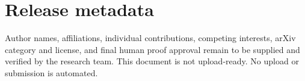 \documentclass[a4paper,twocolumn,11pt,unpublished]{quantumarticle}
\begin{document}
\section*{Release metadata}

Author names, affiliations, individual contributions, competing interests,
arXiv category and license, and final human proof approval remain to be supplied
and verified by the research team.  This document is not upload-ready.  No
upload or submission is automated.

\begingroup
\small


\endgroup

\clearpage
\onecolumngrid
\appendix

\end{document}
